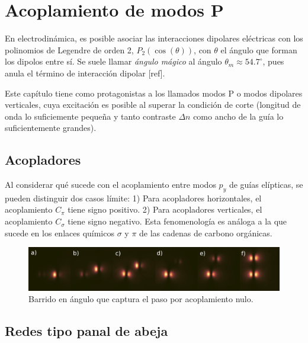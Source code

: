 \chapter{Acoplamiento de modos P}
En electrodinámica, es posible asociar las interacciones dipolares eléctricas con los polinomios de Legendre de orden 2, $P_2(\cos(\theta))$, con $\theta$ el ángulo que forman los dipolos entre sí. Se suele llamar \textit{ángulo mágico} al ángulo $\theta_m \approx 54.7^\circ$, pues anula el término de interacción dipolar [ref]. 

Este capítulo tiene como protagonistas a los llamados modos P o modos dipolares verticales, cuya excitación es posible al superar la condición de corte (longitud de onda lo suficiemente pequeña y tanto contraste $\Delta n$ como ancho de la guía lo suficientemente grandes). 



\section{Acopladores}
Al considerar qué sucede con el acoplamiento entre modos $p_y$ de guías elípticas, se pueden distinguir dos casos límite: 1) Para acopladores horizontales, el acoplamiento $C_\pi$ tiene signo positivo. 2) Para acopladores verticales, el acoplamiento $C_\sigma$ tiene signo negativo. Esta fenomenología es análoga a la que sucede en los enlaces químicos $\sigma$ y $\pi$ de las cadenas de carbono orgánicas. 
\begin{figure}[H]
	\centering
	\includegraphics[width=\linewidth]{media/dipoles}
	\caption{Barrido en ángulo que captura el paso por acoplamiento nulo.}
\end{figure}
\section{Redes tipo panal de abeja}

